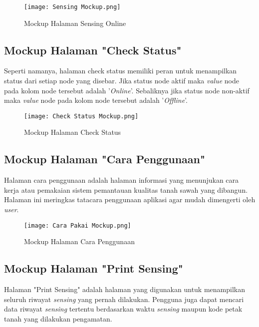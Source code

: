    \begin{figure}[H]
    	\centering  
    	\texttt{[image: Sensing Mockup.png]}  
    	\caption[Mockup Halaman Sensing Online]{Mockup Halaman Sensing Online} 
    	\label{fig:Mockup Halaman Sensing} 
    \end{figure}
   
   
   \subsection{Mockup Halaman "Check Status"}
   Seperti namanya, halaman check status memiliki peran untuk menampilkan status dari setiap node yang disebar. Jika status node aktif maka \textit{value} node pada kolom node tersebut adalah '\textit{Online}'. Sebaliknya jika status node non-aktif maka \textit{value} node pada kolom node tersebut adalah '\textit{Offline}'.
   
   \begin{figure}[H]
    	\centering  
    	\texttt{[image: Check Status Mockup.png]}  
    	\caption[Mockup Halaman Check Status]{Mockup Halaman Check Status} 
    	\label{fig:Mockup Halaman Check Status} 
    \end{figure}
   
   \subsection{Mockup Halaman "Cara Penggunaan"}
   Halaman cara penggunaan adalah halaman informasi yang menunjukan cara kerja atau pemakaian sistem pemantauan kualitas tanah sawah yang dibangun. Halaman ini meringkas tatacara penggunaan aplikasi agar mudah dimengerti oleh \textit{user}.
   
   \begin{figure}[H]
    	\centering  
    	\texttt{[image: Cara Pakai Mockup.png]}  
    	\caption[Mockup Halaman Cara Penggunaan]{Mockup Halaman Cara Penggunaan} 
    	\label{fig:Mockup Halaman Cara Penggunaan} 
    \end{figure}
    
    \subsection{Mockup Halaman "Print Sensing"}
    Halaman "Print Sensing" adalah halaman yang digunakan untuk menampilkan seluruh riwayat \textit{sensing} yang pernah dilakukan. Pengguna juga dapat mencari data riwayat \textit{sensing} tertentu berdasarkan waktu \textit{sensing} maupun kode petak tanah yang dilakukan pengamatan.
    
